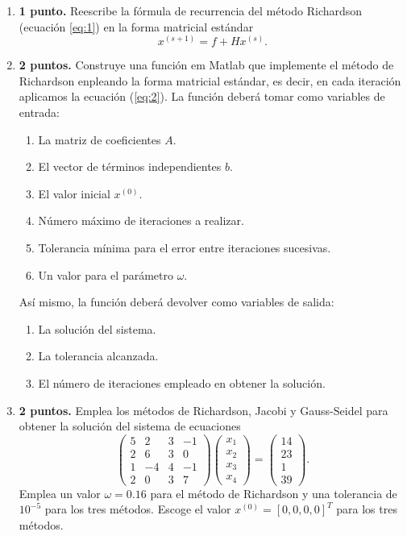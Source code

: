  \begin{enumerate}
\item {\bf 1 punto.} Reescribe la fórmula de recurrencia del método Richardson (ecuación \ref{eq:1})  en la forma matricial estándar
\begin{equation}\label{eq:2}
x^{(s+1)} = f + Hx^{(s)}.
\end{equation}

\item {\bf 2 puntos.} Construye una función em Matlab que implemente el método de Richardson enpleando la forma matricial estándar, es decir, en cada iteración aplicamos la ecuación (\ref{eq:2}). La función deberá tomar como variables de entrada: 
\begin{enumerate}
	\item La matriz de coeficientes $A$.
	\item El vector de términos independientes $b$.
	\item El valor inicial $x^{(0)}$.
	\item Número máximo de iteraciones a realizar.
	\item Tolerancia mínima para el error entre iteraciones sucesivas.
	\item Un valor para el parámetro $\omega$.
\end{enumerate}
Así mismo, la función deberá devolver como variables de salida: 
\begin{enumerate}
\item La solución del sistema.
\item La tolerancia alcanzada.
\item El número de iteraciones empleado en obtener la solución.
\end{enumerate}

\item {\bf 2 puntos.} Emplea los métodos de Richardson, Jacobi y Gauss-Seidel para obtener la solución del sistema de ecuaciones
\begin{equation*}
\begin{pmatrix}
5&2&3&-1\\
2&6&3&0\\
1&-4&4&-1\\
2&0&3&7
\end{pmatrix}\begin{pmatrix}
x_1\\ x_2\\ x_3\\ x_4
\end{pmatrix}= \begin{pmatrix}
14\\ 23\\1\\ 39
\end{pmatrix}.
\end{equation*}
		 Emplea un valor $\omega = 0.16$ para el método de Richardson y una tolerancia de $10^{-5}$ para los tres métodos. Escoge el valor $x^{(0)}=\left[0,0,0,0\right]^T$ para los tres métodos.


\end{enumerate}
